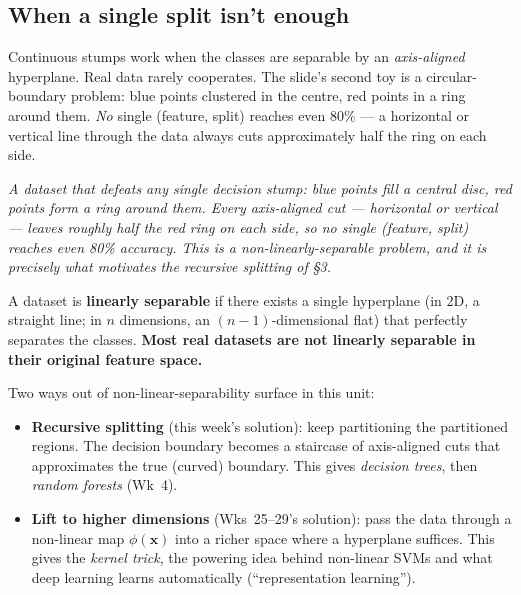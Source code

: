 \documentclass[11pt, a4paper]{article}
\begin{document}
\subsection{When a single split isn't enough}

Continuous stumps work when the classes are separable by an \emph{axis-aligned} hyperplane. Real data rarely cooperates. The slide's second toy is a circular-boundary problem: blue points clustered in the centre, red points in a ring around them. \emph{No} single (feature, split) reaches even 80\% — a horizontal or vertical line through the data always cuts approximately half the ring on each side.

\begin{center}

\footnotesize\textit{A dataset that defeats any single decision stump: blue points fill a central disc, red points form a ring around them. Every axis-aligned cut --- horizontal or vertical --- leaves roughly half the red ring on each side, so no single (feature, split) reaches even 80\% accuracy. This is a non-linearly-separable problem, and it is precisely what motivates the recursive splitting of \S3.}
\end{center}

\begin{defbox}
A dataset is \textbf{linearly separable} if there exists a single hyperplane (in 2D, a straight line; in $n$ dimensions, an $(n-1)$-dimensional flat) that perfectly separates the classes. \textbf{Most real datasets are not linearly separable in their original feature space.}
\end{defbox}

\begin{notebox}
Two ways out of non-linear-separability surface in this unit:
\begin{itemize}
  \item \textbf{Recursive splitting} (this week's solution): keep partitioning the partitioned regions. The decision boundary becomes a staircase of axis-aligned cuts that approximates the true (curved) boundary. This gives \emph{decision trees}, then \emph{random forests} (Wk~4).
  \item \textbf{Lift to higher dimensions} (Wks~25--29's solution): pass the data through a non-linear map $\phi(\mathbf{x})$ into a richer space where a hyperplane suffices. This gives the \emph{kernel trick}, the powering idea behind non-linear SVMs and what deep learning learns automatically (``representation learning'').
\end{itemize}
\end{notebox}
\end{document}
